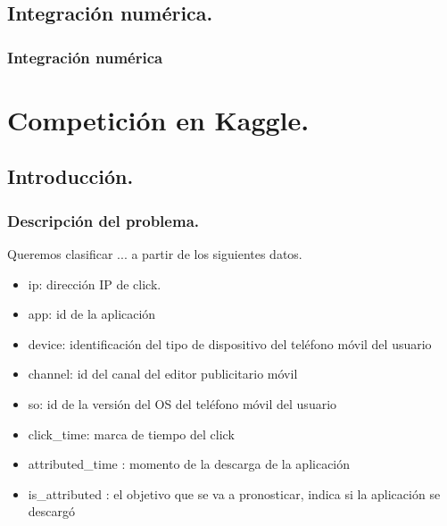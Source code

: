 \documentclass{beamer}
\theoremstyle{plain}
\theoremstyle{definition}
\theoremstyle{plain}
\theoremstyle{definition}
\theoremstyle{remark}
\theoremstyle{definition}
\theoremstyle{lem}
\theoremstyle{cor}
\begin{document}
\subsection{Integración numérica.}
\begin{frame}
	\frametitle{Integración numérica}
\end{frame}

\section{Competición en Kaggle.}
\subsection{Introducción.}
\begin{frame}
	\frametitle{Descripción del problema.}
	Queremos clasificar ... a partir de los siguientes datos.
\begin{itemize}
	
	\item ip: dirección IP de click.
	\item app: id de la aplicación
	\item device: identificación del tipo de dispositivo del teléfono móvil del usuario
	\item channel: id del canal del editor publicitario móvil
	\item so: id de la versión del OS del teléfono móvil del usuario
	\item click\_time: marca de tiempo del click 
	\item attributed\_time : momento de la descarga de la aplicación 
	\item is\_attributed : el objetivo que se va a pronosticar, indica si la aplicación se descargó
\end{itemize}
\end{frame}
\end{document}
